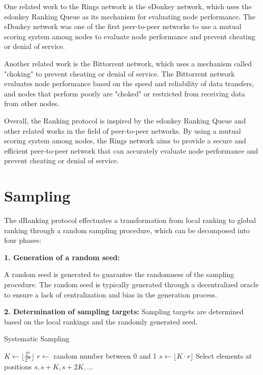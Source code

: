 \documentclass[twocolumn]{article}
\begin{document}
One related work to the Rings network is the eDonkey network, which uses the edonkey Ranking Queue as its mechanism for evaluating node performance. The eDonkey network was one of the first peer-to-peer networks to use a mutual scoring system among nodes to evaluate node performance and prevent cheating or denial of service.

Another related work is the Bittorrent network, which uses a mechanism called "choking" to prevent cheating or denial of service. The Bittorrent network evaluates node performance based on the speed and reliability of data transfers, and nodes that perform poorly are "choked" or restricted from receiving data from other nodes.

Overall, the Ranking protocol is inspired by the edonkey Ranking Queue and other related works in the field of peer-to-peer networks. By using a mutual scoring system among nodes, the Rings network aims to provide a secure and efficient peer-to-peer network that can accurately evaluate node performance and prevent cheating or denial of service.

\section{Sampling}

The dRanking protocol effectuates a transformation from local ranking to global ranking through a random sampling procedure, which can be decomposed into four phases:

\textbf{1. Generation of a random seed:}

A random seed is generated to guarantee the randomness of the sampling procedure. The random seed is typically generated through a decentralized oracle to ensure a lack of centralization and bias in the generation process.

\textbf{2. Determination of sampling targets:} Sampling targets are determined based on the local rankings and the randomly generated seed.

\begin{algorithm}[htbp]
  \caption{Systematic Sampling}
  \label{samping}
\begin{algorithmic}[1]
\State $K \gets \lfloor \frac{2^n}{2^m} \rfloor$
\State $r \gets$ random number between 0 and 1
\State $s \gets \lfloor K \cdot r \rfloor$
\State Select elements at positions $s, s + K, s + 2K, \dots$
\end{algorithmic}
\end{algorithm}
\end{document}
